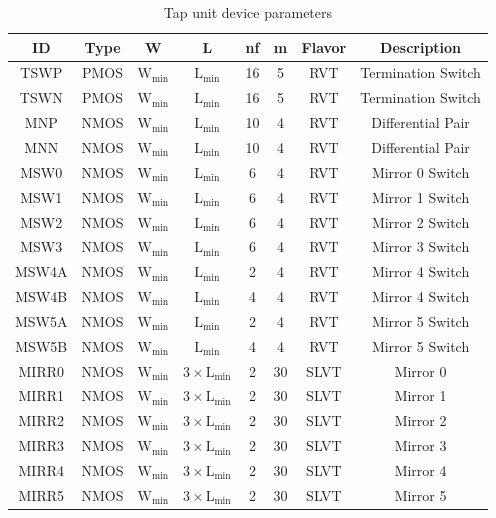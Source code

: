 \begin{table}[htbp]
 \centering
 \caption{Tap unit device parameters}\label{tab:tap_unit_device_parameters}
 \begin{tabular}{cccccccc}
		\hline \hline	
		\textbf{ID} & \textbf{Type} & \textbf{W} & \textbf{L} & \textbf{nf} & \textbf{m} & \textbf{Flavor} & \textbf{Description} \\
		\hline
		TSWP & PMOS & $\mathrm{W_{min}}$ & $\mathrm{L_{min}}$ & 16 & 5 & RVT & Termination Switch\\
		TSWN & PMOS & $\mathrm{W_{min}}$ & $\mathrm{L_{min}}$ & 16 & 5 & RVT & Termination Switch\\
		MNP & NMOS & $\mathrm{W_{min}}$ & $\mathrm{L_{min}}$ & 10 & 4 & RVT & Differential Pair\\
		MNN & NMOS & $\mathrm{W_{min}}$ & $\mathrm{L_{min}}$ & 10 & 4 & RVT & Differential Pair\\
		MSW0 & NMOS & $\mathrm{W_{min}}$ & $\mathrm{L_{min}}$ & 6 & 4 & RVT & Mirror 0 Switch\\
		MSW1 & NMOS & $\mathrm{W_{min}}$ & $\mathrm{L_{min}}$ & 6 & 4 & RVT & Mirror 1 Switch\\
		MSW2 & NMOS & $\mathrm{W_{min}}$ & $\mathrm{L_{min}}$ & 6 & 4 & RVT & Mirror 2 Switch\\
		MSW3 & NMOS & $\mathrm{W_{min}}$ & $\mathrm{L_{min}}$ & 6 & 4 & RVT & Mirror 3 Switch\\
		MSW4A & NMOS & $\mathrm{W_{min}}$ & $\mathrm{L_{min}}$ & 2 & 4 & RVT & Mirror 4 Switch\\
		MSW4B & NMOS & $\mathrm{W_{min}}$ & $\mathrm{L_{min}}$ & 4 & 4 & RVT & Mirror 4 Switch\\
		MSW5A & NMOS & $\mathrm{W_{min}}$ & $\mathrm{L_{min}}$ & 2 & 4 & RVT & Mirror 5 Switch\\
		MSW5B & NMOS & $\mathrm{W_{min}}$ & $\mathrm{L_{min}}$ & 4 & 4 & RVT & Mirror 5 Switch\\
		MIRR0 & NMOS & $\mathrm{W_{min}}$ & $3 \times \mathrm{L_{min}}$ & 2 & 30 & SLVT & Mirror 0\\
		MIRR1 & NMOS & $\mathrm{W_{min}}$ & $3 \times \mathrm{L_{min}}$ & 2 & 30 & SLVT & Mirror 1\\
		MIRR2 & NMOS & $\mathrm{W_{min}}$ & $3 \times \mathrm{L_{min}}$ & 2 & 30 & SLVT & Mirror 2\\
		MIRR3 & NMOS & $\mathrm{W_{min}}$ & $3 \times \mathrm{L_{min}}$ & 2 & 30 & SLVT & Mirror 3\\
		MIRR4 & NMOS & $\mathrm{W_{min}}$ & $3 \times \mathrm{L_{min}}$ & 2 & 30 & SLVT & Mirror 4\\
		MIRR5 & NMOS & $\mathrm{W_{min}}$ & $3 \times \mathrm{L_{min}}$ & 2 & 30 & SLVT & Mirror 5\\
		\hline \hline
	\end{tabular}
\end{table}

